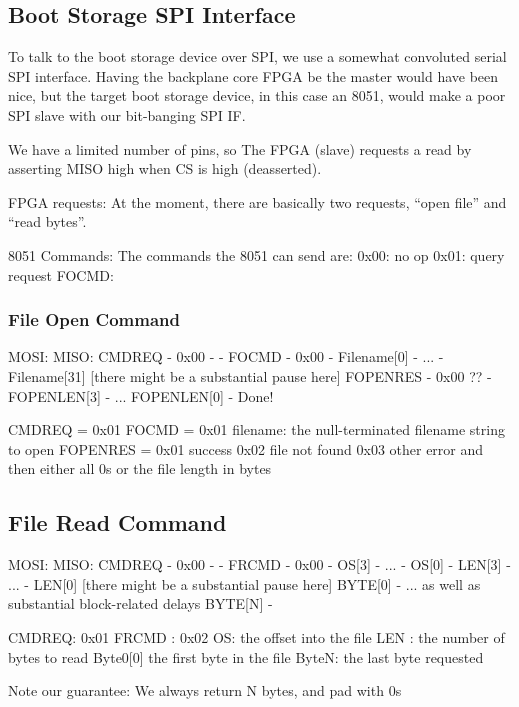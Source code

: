 \subsection{Boot Storage SPI Interface}

To talk to the boot storage device over SPI, we use a somewhat
convoluted serial SPI interface. Having the backplane core FPGA be the
master would have been nice, but the target boot storage device, in this
case an 8051, would make a poor SPI slave with our bit-banging SPI IF. 

We have a limited number of pins, so The FPGA (slave) requests a read
by asserting MISO high when CS is high (deasserted). 

FPGA requests: At the moment, there are basically two requests, ``open
file'' and ``read bytes''.

8051 Commands: The commands the 8051 can send are: 
0x00: no op
0x01: query request
FOCMD: 
\subsubsection{File Open Command}
MOSI:          MISO:
CMDREQ          - 
 0x00           -
  -            FOCMD
  -            0x00
  -            Filename[0]
  -             ...
  -            Filename[31]
     [there might be a substantial pause here]
FOPENRES         -
0x00 ??            -
FOPENLEN[3]      -
...
FOPENLEN[0]      - 
Done!


CMDREQ = 0x01
FOCMD  = 0x01
filename: the null-terminated filename string to open
FOPENRES = 0x01 success
           0x02 file not found
           0x03 other error
and then either all 0s or the file length in bytes


\subsection{File Read Command}
MOSI:           MISO:
CMDREQ            -
0x00              - 
  -             FRCMD
  -             0x00
  -              OS[3]
  -              ...
  -              OS[0]
  -             LEN[3]
  -             ... 
  -             LEN[0]
   [there might be a substantial pause here]
BYTE[0]           -
 ...              as well as substantial block-related delays
BYTE[N]           - 
  
CMDREQ: 0x01
FRCMD : 0x02
OS: the offset into the file
LEN : the number of bytes to read
Byte0[0] the first byte in the file
ByteN: the last byte requested

Note our guarantee: We always return N bytes, and pad with 0s


